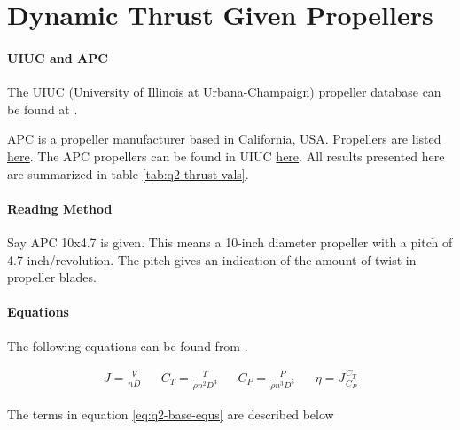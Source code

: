 \section{Dynamic Thrust Given Propellers}

\paragraph*{UIUC and APC}
The UIUC (University of Illinois at Urbana-Champaign) propeller database can be found at \cite{uiuc-database}.

\noindent
APC is a propeller manufacturer based in California, USA. Propellers are listed \href{https://www.apcprop.com/product-category/multi-copters-drones/}{here}. The APC propellers can be found in UIUC \href{https://m-selig.ae.illinois.edu/props/volume-1/propDB-volume-1.html#APC}{here}. All results presented here are summarized in table \ref{tab:q2-thrust-vals}.

\paragraph*{Reading Method}
Say APC 10x4.7 is given. This means a 10-inch diameter propeller with a pitch of 4.7 inch/revolution. The pitch gives an indication of the amount of twist in propeller blades.

\paragraph*{Equations}
The following equations can be found from \cite{brandt2011propeller,aerotrash-uiuc-article,uiuc-data-equs}.

\begin{align}
    J = \frac{V}{nD} &&
    C_{T} = \frac{T}{\rho n^2 D^4} &&
    C_{P} = \frac{P}{\rho n^3 D^5} &&
    \eta = J \frac{C_T}{C_P}
    \label{eq:q2-base-equs}
\end{align}

The terms in equation \ref{eq:q2-base-equs} are described below

